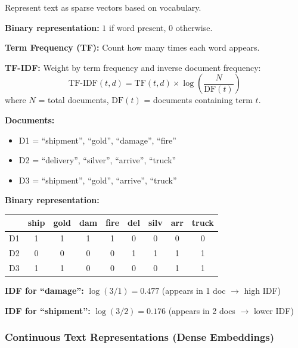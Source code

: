 \begin{defbox}
Represent text as sparse vectors based on vocabulary.

\textbf{Binary representation:} $1$ if word present, $0$ otherwise.

\textbf{Term Frequency (TF):} Count how many times each word appears.

\textbf{TF-IDF:} Weight by term frequency and inverse document frequency:
\[
\text{TF-IDF}(t, d) = \text{TF}(t, d) \times \log\left(\frac{N}{\text{DF}(t)}\right)
\]
where $N$ = total documents, $\text{DF}(t)$ = documents containing term $t$.
\end{defbox}

\begin{exbox}
\textbf{Documents:}
\begin{itemize}
  \item D1 = ``shipment'', ``gold'', ``damage'', ``fire''
  \item D2 = ``delivery'', ``silver'', ``arrive'', ``truck''
  \item D3 = ``shipment'', ``gold'', ``arrive'', ``truck''
\end{itemize}

\textbf{Binary representation:}
\begin{center}
\renewcommand{\arraystretch}{1.2}
\begin{tabular}{@{} l c c c c c c c c @{}}
\toprule
& ship & gold & dam & fire & del & silv & arr & truck \\
\midrule
D1 & 1 & 1 & 1 & 1 & 0 & 0 & 0 & 0 \\
D2 & 0 & 0 & 0 & 0 & 1 & 1 & 1 & 1 \\
D3 & 1 & 1 & 0 & 0 & 0 & 0 & 1 & 1 \\
\bottomrule
\end{tabular}
\end{center}

\textbf{IDF for ``damage'':} $\log(3/1) = 0.477$ (appears in 1 doc $\to$ high IDF)

\textbf{IDF for ``shipment'':} $\log(3/2) = 0.176$ (appears in 2 docs $\to$ lower IDF)
\end{exbox}

\bigseparator

\subsubsection{Continuous Text Representations (Dense Embeddings)}

